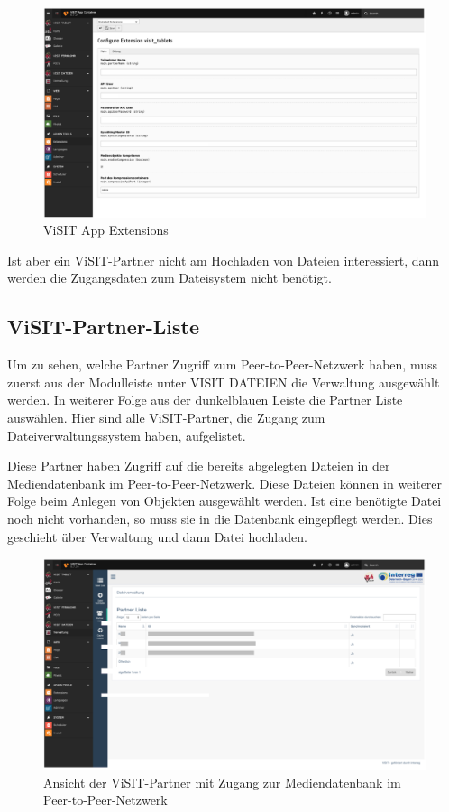 \begin{figure}[ht!]
\centering
\includegraphics[width=12cm]{Figures/paula/dateiverwaltung/extensions.png}
\caption{ViSIT App Extensions}
\label{img:extensions}
\end{figure}

Ist aber ein ViSIT-Partner nicht am Hochladen von Dateien interessiert, dann werden die Zugangsdaten zum Dateisystem nicht benötigt.

\subsection{ViSIT-Partner-Liste}

Um zu sehen, welche Partner Zugriff zum Peer-to-Peer-Netzwerk haben, muss zuerst aus der Modulleiste unter VISIT DATEIEN die Verwaltung ausgewählt werden. In weiterer Folge  aus der dunkelblauen Leiste die Partner Liste auswählen. Hier sind alle ViSIT-Partner, die Zugang zum Dateiverwaltungssystem haben, aufgelistet.

Diese Partner haben Zugriff auf die bereits abgelegten Dateien in der Mediendatenbank im Peer-to-Peer-Netzwerk. Diese Dateien können in weiterer Folge beim Anlegen von Objekten ausgewählt werden. Ist eine benötigte Datei noch nicht vorhanden, so muss sie in die Datenbank eingepflegt werden. Dies geschieht über Verwaltung und dann Datei hochladen.\\

\begin{figure}[ht!]
\centering
\includegraphics[width=12cm]{Figures/paula/dateiverwaltung/visit_partner.png}
\caption{Ansicht der ViSIT-Partner mit Zugang zur Mediendatenbank im Peer-to-Peer-Netzwerk}
\label{img:visit_partner}
\end{figure}

